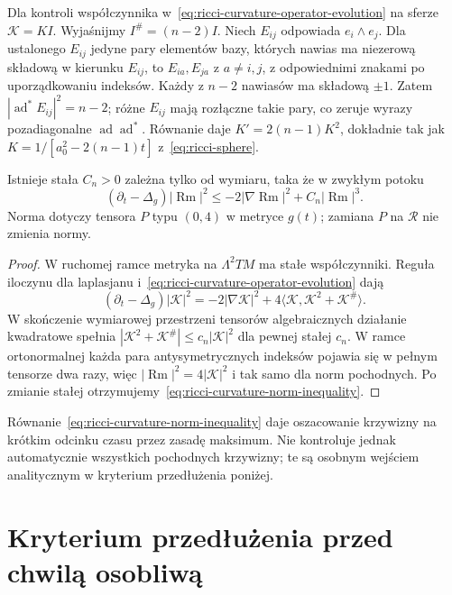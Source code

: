 Dla kontroli współczynnika w~\eqref{eq:ricci-curvature-operator-evolution}
na sferze $\mathscr K=KI$. Wyjaśnijmy $I^\#=(n-2)I$.
Niech $E_{ij}$ odpowiada $e_i\wedge e_j$. Dla ustalonego
$E_{ij}$ jedyne pary elementów bazy, których nawias ma
niezerową składową w kierunku $E_{ij}$, to
$E_{ia},E_{ja}$ z $a\ne i,j$, z odpowiednimi znakami
po uporządkowaniu indeksów. Każdy z $n-2$ nawiasów
ma składową $\pm1$. Zatem $|\operatorname{ad}^*E_{ij}|^2=n-2$;
różne $E_{ij}$ mają rozłączne takie pary, co zeruje
wyrazy pozadiagonalne $\operatorname{ad}\operatorname{ad}^*$.
Równanie daje
$K'=2(n-1)K^2$, dokładnie tak jak
$K=1/[a_0^2-2(n-1)t]$
z~\eqref{eq:ricci-sphere}.

\begin{stwierdzenie}
\label{prop:ricci-curvature-inequality}
Istnieje stała $C_n>0$ zależna tylko od wymiaru,
taka że w zwykłym potoku
\begin{equation}\label{eq:ricci-curvature-norm-inequality}
 (\partial_t-\Delta_g)|\operatorname{Rm}|^2
 \leq -2|\nabla\operatorname{Rm}|^2
       +C_n|\operatorname{Rm}|^3.
\end{equation}
Norma dotyczy tensora $P$ typu $(0,4)$ w metryce
$g(t)$; zamiana $P$ na $\mathcal R$ nie zmienia normy.
\end{stwierdzenie}
\begin{proof}
W ruchomej ramce metryka na $\Lambda^2TM$ ma
stałe współczynniki. Reguła iloczynu dla laplasjanu
i~\eqref{eq:ricci-curvature-operator-evolution} dają
\[
 (\partial_t-\Delta_g)|\mathscr K|^2
 =-2|\nabla\mathscr K|^2
   +4\langle\mathscr K,
            \mathscr K^2+\mathscr K^\#\rangle.
\]
W skończenie wymiarowej przestrzeni tensorów
algebraicznych działanie kwadratowe spełnia
$|\mathscr K^2+\mathscr K^\#|
\leq c_n|\mathscr K|^2$ dla pewnej stałej $c_n$.
W ramce ortonormalnej każda para antysymetrycznych
indeksów pojawia się w pełnym tensorze dwa razy,
więc $|\operatorname{Rm}|^2=4|\mathscr K|^2$
i tak samo dla norm pochodnych. Po zmianie stałej
otrzymujemy~\eqref{eq:ricci-curvature-norm-inequality}.
\end{proof}

Równanie~\eqref{eq:ricci-curvature-norm-inequality}
daje oszacowanie krzywizny na krótkim odcinku czasu
przez zasadę maksimum. Nie kontroluje jednak
automatycznie wszystkich pochodnych krzywizny;
te są osobnym wejściem analitycznym w kryterium
przedłużenia poniżej.

\section{Kryterium przedłużenia przed chwilą osobliwą}
\label{sec:ricci-continuation}

